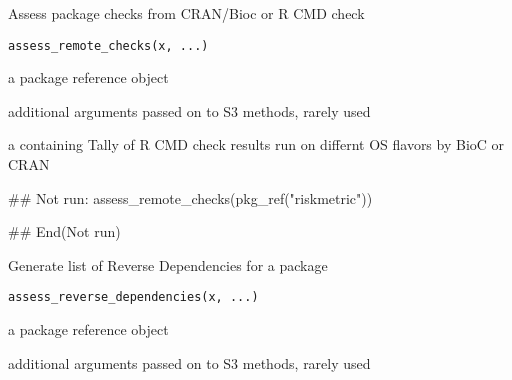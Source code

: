 \documentclass[a4paper]{book}
\begin{document}
%
\begin{Description}
Assess package checks from CRAN/Bioc or R CMD check
\end{Description}
%
\begin{Usage}
\begin{verbatim}
assess_remote_checks(x, ...)
\end{verbatim}
\end{Usage}
%
\begin{Arguments}
\begin{ldescription}
\item[\code{x}] a  package reference object

\item[\code{...}] additional arguments passed on to S3 methods, rarely used
\end{ldescription}
\end{Arguments}
%
\begin{Value}
a  containing Tally of R CMD check results run on differnt OS flavors by BioC or CRAN
\end{Value}
%
\begin{SeeAlso}
\end{SeeAlso}
%
\begin{Examples}
\begin{ExampleCode}
## Not run: 
assess_remote_checks(pkg_ref("riskmetric"))

## End(Not run)
\end{ExampleCode}
\end{Examples}
%
\begin{Description}
Generate list of Reverse Dependencies for a package
\end{Description}
%
\begin{Usage}
\begin{verbatim}
assess_reverse_dependencies(x, ...)
\end{verbatim}
\end{Usage}
%
\begin{Arguments}
\begin{ldescription}
\item[\code{x}] a  package reference object

\item[\code{...}] additional arguments passed on to S3 methods, rarely used
\end{ldescription}
\end{Arguments}
\end{document}
